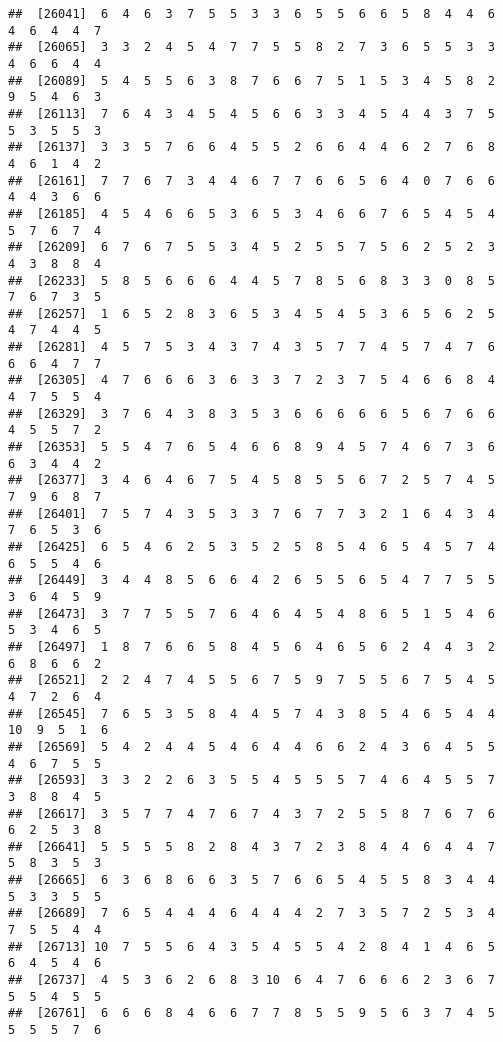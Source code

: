 \documentclass[
]{book}
\begin{document}
\begin{verbatim}
##  [26041]  6  4  6  3  7  5  5  3  3  6  5  5  6  6  5  8  4  4  6  4  6  4  4  7
##  [26065]  3  3  2  4  5  4  7  7  5  5  8  2  7  3  6  5  5  3  3  4  6  6  4  4
##  [26089]  5  4  5  5  6  3  8  7  6  6  7  5  1  5  3  4  5  8  2  9  5  4  6  3
##  [26113]  7  6  4  3  4  5  4  5  6  6  3  3  4  5  4  4  3  7  5  5  3  5  5  3
##  [26137]  3  3  5  7  6  6  4  5  5  2  6  6  4  4  6  2  7  6  8  4  6  1  4  2
##  [26161]  7  7  6  7  3  4  4  6  7  7  6  6  5  6  4  0  7  6  6  4  4  3  6  6
##  [26185]  4  5  4  6  6  5  3  6  5  3  4  6  6  7  6  5  4  5  4  5  7  6  7  4
##  [26209]  6  7  6  7  5  5  3  4  5  2  5  5  7  5  6  2  5  2  3  4  3  8  8  4
##  [26233]  5  8  5  6  6  6  4  4  5  7  8  5  6  8  3  3  0  8  5  7  6  7  3  5
##  [26257]  1  6  5  2  8  3  6  5  3  4  5  4  5  3  6  5  6  2  5  4  7  4  4  5
##  [26281]  4  5  7  5  3  4  3  7  4  3  5  7  7  4  5  7  4  7  6  6  6  4  7  7
##  [26305]  4  7  6  6  6  3  6  3  3  7  2  3  7  5  4  6  6  8  4  4  7  5  5  4
##  [26329]  3  7  6  4  3  8  3  5  3  6  6  6  6  6  5  6  7  6  6  4  5  5  7  2
##  [26353]  5  5  4  7  6  5  4  6  6  8  9  4  5  7  4  6  7  3  6  6  3  4  4  2
##  [26377]  3  4  6  4  6  7  5  4  5  8  5  5  6  7  2  5  7  4  5  7  9  6  8  7
##  [26401]  7  5  7  4  3  5  3  3  7  6  7  7  3  2  1  6  4  3  4  7  6  5  3  6
##  [26425]  6  5  4  6  2  5  3  5  2  5  8  5  4  6  5  4  5  7  4  6  5  5  4  6
##  [26449]  3  4  4  8  5  6  6  4  2  6  5  5  6  5  4  7  7  5  5  3  6  4  5  9
##  [26473]  3  7  7  5  5  7  6  4  6  4  5  4  8  6  5  1  5  4  6  5  3  4  6  5
##  [26497]  1  8  7  6  6  5  8  4  5  6  4  6  5  6  2  4  4  3  2  6  8  6  6  2
##  [26521]  2  2  4  7  4  5  5  6  7  5  9  7  5  5  6  7  5  4  5  4  7  2  6  4
##  [26545]  7  6  5  3  5  8  4  4  5  7  4  3  8  5  4  6  5  4  4 10  9  5  1  6
##  [26569]  5  4  2  4  4  5  4  6  4  4  6  6  2  4  3  6  4  5  5  4  6  7  5  5
##  [26593]  3  3  2  2  6  3  5  5  4  5  5  5  7  4  6  4  5  5  7  3  8  8  4  5
##  [26617]  3  5  7  7  4  7  6  7  4  3  7  2  5  5  8  7  6  7  6  6  2  5  3  8
##  [26641]  5  5  5  5  8  2  8  4  3  7  2  3  8  4  4  6  4  4  7  5  8  3  5  3
##  [26665]  6  3  6  8  6  6  3  5  7  6  6  5  4  5  5  8  3  4  4  5  3  3  5  5
##  [26689]  7  6  5  4  4  4  6  4  4  4  2  7  3  5  7  2  5  3  4  7  5  5  4  4
##  [26713] 10  7  5  5  6  4  3  5  4  5  5  4  2  8  4  1  4  6  5  6  4  5  4  6
##  [26737]  4  5  3  6  2  6  8  3 10  6  4  7  6  6  6  2  3  6  7  5  5  4  5  5
##  [26761]  6  6  6  8  4  6  6  7  7  8  5  5  9  5  6  3  7  4  5  5  5  5  7  6

\end{verbatim}
\end{document}
